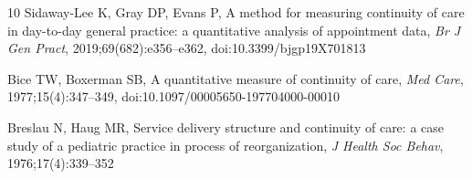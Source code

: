 \documentclass[11pt,a4paper]{article}
\begin{document}
\begin{thebibliography}{10}
Sidaway-Lee K, Gray DP, Evans P,
A method for measuring continuity of care in day-to-day general practice: a quantitative analysis of appointment data,
\textit{Br J Gen Pract}, 2019;69(682):e356--e362,
doi:10.3399/bjgp19X701813

Bice TW, Boxerman SB,
A quantitative measure of continuity of care,
\textit{Med Care}, 1977;15(4):347--349,
doi:10.1097/00005650-197704000-00010

Breslau N, Haug MR,
Service delivery structure and continuity of care: a case study of a pediatric practice in process of reorganization,
\textit{J Health Soc Behav}, 1976;17(4):339--352

\end{thebibliography}
\end{document}
